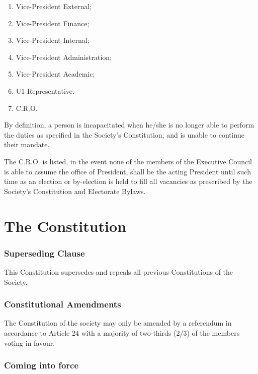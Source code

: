 \begin{enumerate}
\def\labelenumi{(\alph{enumi})}
\tightlist
\item
  Vice-President External;
\item
  Vice-President Finance;
\item
  Vice-President Internal;
\item
  Vice-President Administration;
\item
  Vice-President Academic;
\item
  U1 Representative.
\item
  C.R.O.
\end{enumerate}

By definition, a person is incapacitated when he/she is no longer able
to perform the duties as specified in the Society's Constitution, and is
unable to continue their mandate.

The C.R.O. is listed, in the event none of the members of the Executive
Council is able to assume the office of President, shall be the acting
President until such time as an election or by-election is held to fill
all vacancies as prescribed by the Society's Constitution and Electorate
Bylaws.

\part{The Constitution}\label{the-constitution}

\section{Superseding Clause}\label{superseding-clause}

This Constitution supersedes and repeals all previous Constitutions of
the Society.

\section{Constitutional
Amendments}\label{constitutional-amendments}

The Constitution of the society may only be amended by a referendum in
accordance to Article 24 with a majority of two-thirds (2/3) of the
members voting in favour.

\section{Coming into force}\label{coming-into-force}

